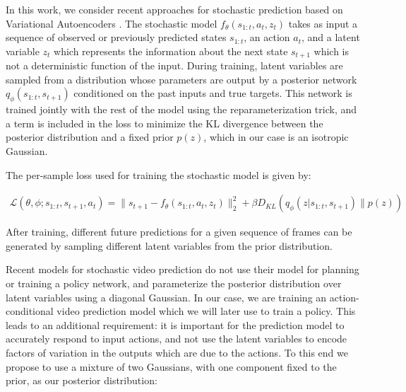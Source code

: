 \documentclass{article} %
\begin{document}
In this work, we consider recent approaches for stochastic prediction based on Variational Autoencoders \citep{VAE, Babaeizadeh2018, Denton2018}.
The stochastic model $f_\theta(s_{1:t}, a_t, z_t)$ takes as input a sequence of observed or previously predicted states $s_{1:t}$, an action $a_t$,
and a latent variable $z_t$ which represents the information about the next state $s_{t+1}$ which is not a deterministic function of the input.
During training, latent variables are sampled from a distribution whose parameters are output by a posterior network $q_\phi(s_{1:t}, s_{t+1})$ conditioned on the past inputs and true targets. This network is trained jointly with the rest of the model using the reparameterization trick, and a term is included in the loss to minimize the KL divergence between the posterior distribution and a fixed prior $p(z)$, which in our case is an isotropic Gaussian.

The per-sample loss used for training the stochastic model is given by:

\begin{align}
  \label{model-loss}
  \mathcal{L}(\theta, \phi ; s_{1:t}, s_{t+1}, a_t) = \|s_{t+1} - f_\theta(s_{1:t}, a_t, z_t) \|_2^2 + \beta D_{KL}(q_\phi(z | s_{1:t}, s_{t+1}) \| p(z))
\end{align}

After training, different future predictions for a given sequence of frames can be generated by sampling different latent variables from the prior distribution.

Recent models for stochastic video prediction \citep{Babaeizadeh2018, Denton2018} do not use their model for planning or training a policy network, and parameterize the posterior distribution over latent variables using a diagonal Gaussian. %
In our case, we are training an action-conditional video prediction model which we will later use to train a policy. This leads to an additional requirement: it is important for the prediction model to accurately respond to input actions, and not use the latent variables to encode factors of variation in the outputs which are due to the actions.
To this end we propose to use a mixture of two Gaussians, with one component fixed to the prior, as our posterior distribution:
\end{document}
